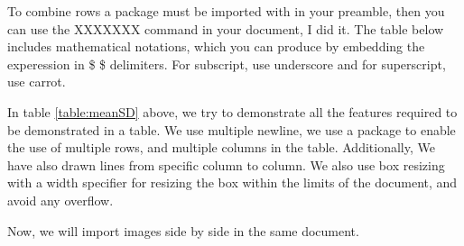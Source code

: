\documentclass[12pt, a4paper]{article}
\begin{document}
To combine rows a package must be imported with in your preamble,
then you can use the XXXXXXX command in your document, I did it. The
table below includes mathematical notations, which you can produce
by embedding the experession in \$ \$ delimiters. For subscript, use
underscore and for superscript, use carrot.

\bigskip
{\Large 
In table \ref{table:meanSD} above, we try to demonstrate all the
features required to be demonstrated in a table. We use multiple newline, we use a package to enable the use of multiple rows, and multiple columns
in the table. Additionally, We have also drawn
lines from specific column to column. We also use
box resizing with a width specifier for resizing the
box within the limits of the document, and avoid
any overflow.
}

\bigskip
Now, we will import images side by side in the same document.


\newpage
\end{document}
